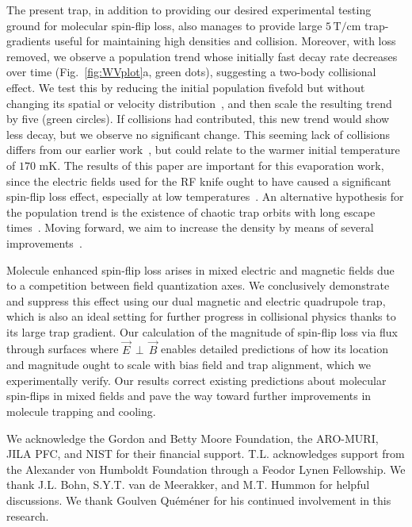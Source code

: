 \documentclass[%
 reprint,
 amsmath,amssymb,
 aps,
prl,
]{revtex4-1}
\newcommand{\epb}{{$\vec{E}\,{\perp}\,\vec{B}$}}
\begin{document}
The present trap, in addition to providing our desired experimental testing ground for molecular spin-flip loss, also manages to provide large $5\,\text{T/cm}$ trap-gradients useful for maintaining high densities and collision.
Moreover, with loss removed, we observe a population trend whose initially fast decay rate decreases over time (Fig.~\ref{fig:WVplot}a, green dots), suggesting a two-body collisional effect.
We test this by reducing the initial population fivefold but without changing its spatial or velocity distribution~\cite{ssm}, and then scale the resulting trend by five (green circles). 
If collisions had contributed, this new trend would show less decay, but we observe no significant change.
This seeming lack of collisions differs from our earlier work~\cite{Stuhl2012evap}, but could relate to the warmer initial temperature of $170\text{ mK}$. 
The results of this paper are important for this evaporation work, since the electric fields used for the RF knife ought to have caused a significant spin-flip loss effect, especially at low temperatures~\cite{ssm}.
An alternative hypothesis for the population trend is the existence of chaotic trap orbits with long escape times~\cite{Gonzalez-Ferez2014}.
Moving forward, we aim to increase the density by means of several improvements~\cite{Even2015,Segev2017}.

Molecule enhanced spin-flip loss arises in mixed electric and magnetic fields due to a competition between field quantization axes.
We conclusively demonstrate and suppress this effect using our dual magnetic and electric quadrupole trap, which is also an ideal setting for further progress in collisional physics thanks to its large trap gradient.
Our calculation of the magnitude of spin-flip loss via flux through surfaces where \epb{} enables detailed predictions of how its location and magnitude ought to scale with bias field and trap alignment, which we experimentally verify.
Our results correct existing predictions about molecular spin-flips in mixed fields and pave the way toward further improvements in molecule trapping and cooling.

\begin{acknowledgments}
We acknowledge the Gordon and Betty Moore Foundation, the ARO-MURI, JILA PFC, and NIST for their financial support. 
T.L. acknowledges support from the Alexander von Humboldt Foundation through a Feodor Lynen Fellowship. 
We thank J.L. Bohn, S.Y.T. van de Meerakker, and M.T. Hummon for helpful discussions. 
We thank Goulven Qu\'em\'ener for his continued involvement in this research.
\end{acknowledgments}



\end{document}
